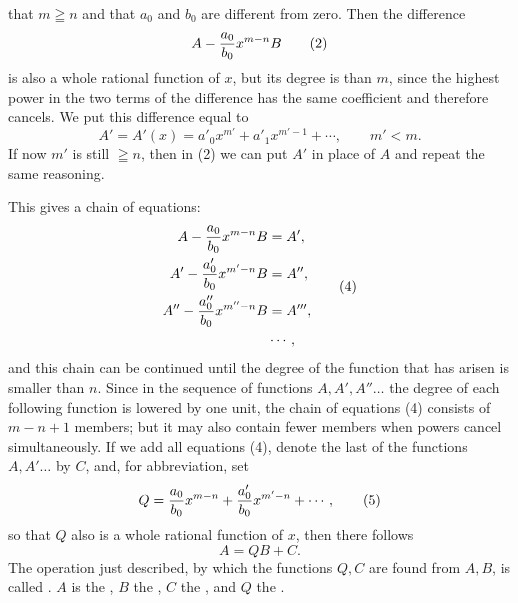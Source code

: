 \begingroup
\setlength{\abovedisplayskip}{5pt plus 2pt minus 1pt}
\setlength{\belowdisplayskip}{5pt plus 2pt minus 1pt}
\setlength{\abovedisplayshortskip}{3pt plus 1pt}
\setlength{\belowdisplayshortskip}{4pt plus 1pt}
\linespread{0.94}\selectfont
that $m\geqq n$ and that $a_0$ and $b_0$ are different from zero. Then
the difference
\begin{equation}
 A-{a_0\over b_0}x^{m-n}B
\tag{2}
\end{equation}
is also a whole rational function of $x$, but its degree is
 than $m$, since the highest power in the two terms
of the difference has the same coefficient and therefore cancels. We
put this difference equal to
\begin{equation}
 A'=A'(x)=a'_0x^{m'}+a'_1x^{m'-1}+\cdots,
 \qquad m'<m.
\tag{3}
\end{equation}
If now $m'$ is still $\geqq n$, then in (2) we can put $A'$ in place of
$A$ and repeat the same reasoning.

This gives a chain of equations:
\begin{equation}
\begin{aligned}
 A-{a_0\over b_0}x^{m-n}B&=A',\\
 A'-{a'_0\over b_0}x^{m'-n}B&=A'',\\
 A''-{a''_0\over b_0}x^{m''-n}B&=A''',\\
 &\cdots,
\end{aligned}
\tag{4}
\end{equation}
and this chain can be continued until the degree of the function that
has arisen is smaller than $n$. Since in the sequence of functions
$A,A',A''\ldots$ the degree of each following function is lowered by
 one unit, the chain of equations (4) consists of
 $m-n+1$ members; but it may also contain fewer
members when  powers cancel simultaneously. If we add
all equations (4), denote the last of the functions $A,A'\ldots$ by
$C$, and, for abbreviation, set
\begin{equation}
 Q={a_0\over b_0}x^{m-n}+{a'_0\over b_0}x^{m'-n}+\cdots,
\tag{5}
\end{equation}
so that $Q$ also is a whole rational function of $x$, then there
follows
\begin{equation}
 A=QB+C.
\tag{6}
\end{equation}
The operation just described, by which the functions $Q,C$ are found
from $A,B$, is called . $A$ is the
, $B$ the , $C$ the
, and $Q$ the . 
\endgroup
